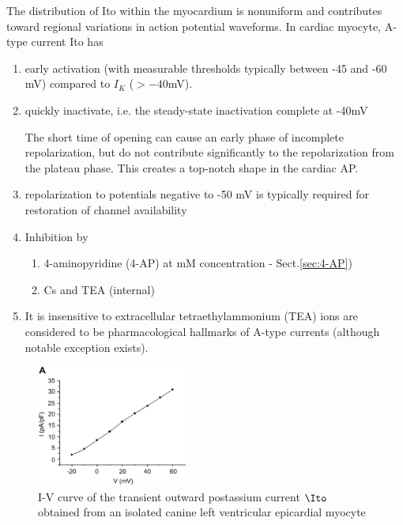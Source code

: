 The distribution of Ito within the myocardium is nonuniform and contributes
toward regional variations in action potential waveforms. In cardiac myocyte,
A-type current Ito has
\begin{enumerate}  
   \item early activation (with measurable thresholds typically between -45 and
   -60 mV) compared to $I_K$ ($> -40$mV).

   \item quickly inactivate, i.e. the steady-state inactivation complete
  at -40mV

The short time of opening can cause an early  phase of incomplete
repolarization, but do not contribute significantly to the repolarization from
the plateau phase. This creates a top-notch shape in the cardiac AP.
   
   \item repolarization to potentials negative to -50 mV is typically required
   for restoration of channel availability
   
   \item Inhibition by  
\begin{enumerate}
  \item 4-aminopyridine (4-AP) at mM concentration -
   Sect.\ref{sec:4-AP})
  \item Cs and TEA (internal)
\end{enumerate}
   
   \item It is insensitive to extracellular tetraethylammonium (TEA) ions are
   considered to be pharmacological hallmarks of A-type currents (although
   notable exception exists).

\end{enumerate}

\begin{figure}[hbt]
  \centerline{\includegraphics[height=4cm,
    angle=0]{./images/IVcurve_Ito.eps}}
\caption{I-V curve of the transient outward postassium current $\Ito$ obtained
from an isolated canine left ventricular epicardial myocyte
\citep{kornreich2007}}
\label{fig:IVcurve-Ito_canine}
\end{figure}


